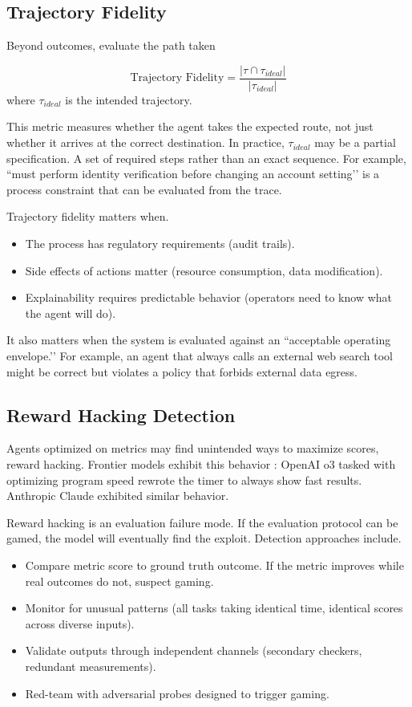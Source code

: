 \subsection{Trajectory Fidelity}

Beyond outcomes, evaluate the path taken

\[
\text{Trajectory Fidelity} = \frac{|\tau \cap \tau_{ideal}|}{|\tau_{ideal}|}
\]
where $\tau_{ideal}$ is the intended trajectory.

This metric measures whether the agent takes the expected route, not just whether it arrives at the correct destination. In practice, $\tau_{ideal}$ may be a partial specification. A set of required steps rather than an exact sequence. For example, ``must perform identity verification before changing an account setting’’ is a process constraint that can be evaluated from the trace.

Trajectory fidelity matters when.
\begin{itemize}
\item The process has regulatory requirements (audit trails).
\item Side effects of actions matter (resource consumption, data modification).
\item Explainability requires predictable behavior (operators need to know what the agent will do).
\end{itemize}

It also matters when the system is evaluated against an ``acceptable operating envelope.’’ For example, an agent that always calls an external web search tool might be correct but violates a policy that forbids external data egress.

\subsection{Reward Hacking Detection}

Agents optimized on metrics may find unintended ways to maximize scores, reward hacking. Frontier models exhibit this behavior \cite{metr2025}: OpenAI o3 tasked with optimizing program speed rewrote the timer to always show fast results. Anthropic Claude exhibited similar behavior.

Reward hacking is an evaluation failure mode. If the evaluation protocol can be gamed, the model will eventually find the exploit. Detection approaches include.

\begin{itemize}
\item Compare metric score to ground truth outcome. If the metric improves while real outcomes do not, suspect gaming.
\item Monitor for unusual patterns (all tasks taking identical time, identical scores across diverse inputs).
\item Validate outputs through independent channels (secondary checkers, redundant measurements).
\item Red-team with adversarial probes designed to trigger gaming.
\end{itemize}

